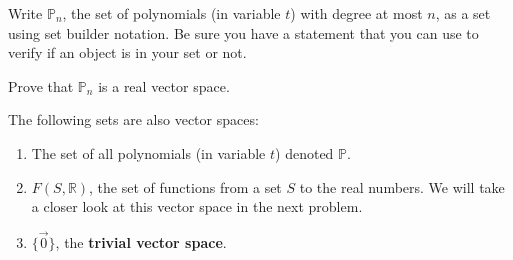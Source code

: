 \bq\label{vse} \be
\item Write $\mathbb{P}_n$, the set of polynomials (in variable $t$) with degree at most $n$, as a set using set builder notation. Be sure you have a statement that you can use to verify if an object is in your set or not.
\item Prove that $\mathbb{P}_n$ is a real vector space.
\ee
\eq
\begin{example}
The following sets are also vector spaces:
\begin{enumerate}
\item The set of all polynomials (in variable $t$) denoted $\mathbb{P}$.
\item $F(S,\mathbb{R})$, the set of functions from a set $S$ to the real numbers. We will take a closer look at this vector space in the next problem.
\item $\{\vec{0}\}$, the \textbf{trivial vector space}.
\end{enumerate}
\end{example}


